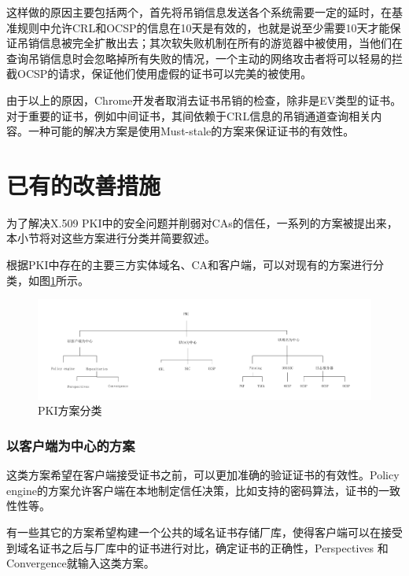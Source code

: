 \begin{itemize}
	这样做的原因主要包括两个，首先将吊销信息发送各个系统需要一定的延时，在基准规则中允许CRL和OCSP的信息在10天是有效的，也就是说至少需要10天才能保证吊销信息被完全扩散出去；其次软失败机制在所有的游览器中被使用，当他们在查询吊销信息时会忽略掉所有失败的情况，一个主动的网络攻击者将可以轻易的拦截OCSP的请求，保证他们使用虚假的证书可以完美的被使用。

	由于以上的原因，Chrome开发者取消去证书吊销的检查，除非是EV类型的证书。对于重要的证书，例如中间证书，其间依赖于CRL信息的吊销通道查询相关内容。一种可能的解决方案是使用Must-stale的方案来保证证书的有效性。

\end{itemize}


\section{已有的改善措施}

为了解决X.509 PKI中的安全问题并削弱对CAs的信任，一系列的方案被提出来，本小节将对这些方案进行分类并简要叙述。



根据PKI中存在的主要三方实体域名、CA和客户端，可以对现有的方案进行分类，如图\ref{fig:Classification_of_PKI_proposals}所示。

\begin{figure}[htbp]
 	\centering
 	\includegraphics[width = 1.0\textwidth]{img/Classification_of_PKI_proposals}
 	\caption{PKI方案分类}\label{fig:Classification_of_PKI_proposals}
\end{figure}



\subsubsection{以客户端为中心的方案}

这类方案希望在客户端接受证书之前，可以更加准确的验证证书的有效性。Policy engine的方案允许客户端在本地制定信任决策，比如支持的密码算法，证书的一致性性等。

有一些其它的方案希望构建一个公共的域名证书存储厂库，使得客户端可以在接受到域名证书之后与厂库中的证书进行对比，确定证书的正确性，Perspectives 和 Convergence就输入这类方案。

